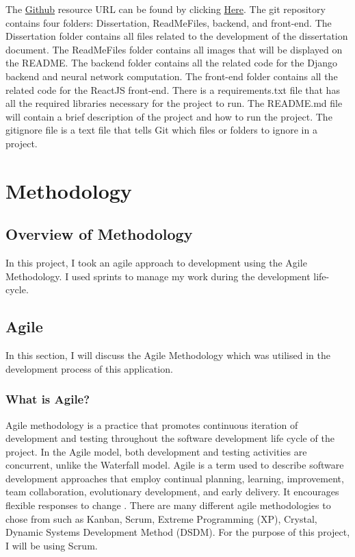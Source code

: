 The \href{https://github.com/MarkReillyGMIT/AppliedProject}{Github} resource URL can be found by clicking \href{https://github.com/MarkReillyGMIT/AppliedProject}{Here}. The git repository contains four folders: Dissertation, ReadMeFiles, backend, and front-end. The Dissertation folder contains all files related to the development of the dissertation document. The ReadMeFiles folder contains all images that will be displayed on the README. The backend folder contains all the related code for the Django backend and neural network computation. The front-end folder contains all the related code for the ReactJS front-end. There is a requirements.txt file that has all the required libraries necessary for the project to run. The README.md file will contain a brief description of the project and how to run the project. The gitignore file is a text file that tells Git which files or folders to ignore in a project. 


\chapter{Methodology}

\section{Overview of Methodology}

In this project, I took an agile approach to development using the Agile Methodology. I used sprints to manage my work during the development life-cycle.

\section{Agile}
In this section, I will discuss the Agile Methodology which was utilised in the development process of this application.

\subsection{What is Agile?}
Agile methodology is a practice that promotes continuous iteration of development and testing throughout the software development life cycle of the project. In the Agile model, both development and testing activities are concurrent, unlike the Waterfall model\cite{Agile}. Agile is a term used to describe software development approaches that employ continual planning, learning, improvement, team collaboration, evolutionary development, and early delivery. It encourages flexible responses to change \cite{Agile}. There are many different agile methodologies to chose from such as Kanban, Scrum, Extreme Programming (XP), Crystal, Dynamic Systems Development Method (DSDM). For the purpose of this project, I will be using Scrum. 


